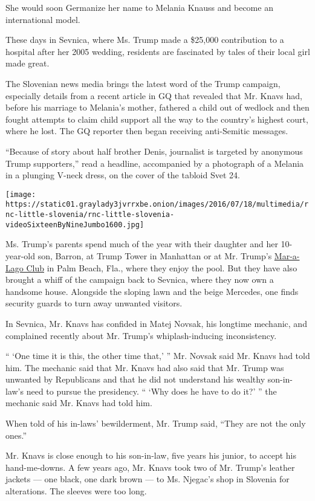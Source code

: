 She would soon Germanize her name to Melania Knauss and become an
international model.

These days in Sevnica, where Ms. Trump made a \$25,000 contribution to a
hospital after her 2005 wedding, residents are fascinated by tales of
their local girl made great.

The Slovenian news media brings the latest word of the Trump campaign,
especially details from a recent article in GQ that revealed that Mr.
Knavs had, before his marriage to Melania's mother, fathered a child out
of wedlock and then fought attempts to claim child support all the way
to the country's highest court, where he lost. The GQ reporter then
began receiving anti-Semitic messages.

``Because of story about half brother Denis, journalist is targeted by
anonymous Trump supporters,'' read a headline, accompanied by a
photograph of a Melania in a plunging V-neck dress, on the cover of the
tabloid Svet 24.

\texttt{[image: https://static01.graylady3jvrrxbe.onion/images/2016/07/18/multimedia/rnc-little-slovenia/rnc-little-slovenia-videoSixteenByNineJumbo1600.jpg]}

Ms. Trump's parents spend much of the year with their daughter and her
10-year-old son, Barron, at Trump Tower in Manhattan or at Mr. Trump's
\href{http://www.nytimes3xbfgragh.onion/2016/02/26/us/politics/donald-trump-taps-foreign-work-force-for-his-florida-club.html}{Mar-a-Lago
Club} in Palm Beach, Fla., where they enjoy the pool. But they have also
brought a whiff of the campaign back to Sevnica, where they now own a
handsome house. Alongside the sloping lawn and the beige Mercedes, one
finds security guards to turn away unwanted visitors.

In Sevnica, Mr. Knavs has confided in Matej Novsak, his longtime
mechanic, and complained recently about Mr. Trump's whiplash-inducing
inconsistency.

`` `One time it is this, the other time that,' '' Mr. Novsak said Mr.
Knavs had told him. The mechanic said that Mr. Knavs had also said that
Mr. Trump was unwanted by Republicans and that he did not understand his
wealthy son-in-law's need to pursue the presidency. `` `Why does he have
to do it?' '' the mechanic said Mr. Knavs had told him.

When told of his in-laws' bewilderment, Mr. Trump said, ``They are not
the only ones.''

Mr. Knavs is close enough to his son-in-law, five years his junior, to
accept his hand-me-downs. A few years ago, Mr. Knavs took two of Mr.
Trump's leather jackets --- one black, one dark brown --- to Ms.
Njegac's shop in Slovenia for alterations. The sleeves were too long.

